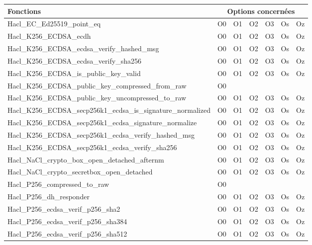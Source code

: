 \raggedleft
\begin{table}[!ht]
  \begin{tabular}{l|cccccc}
    \textbf{Fonctions} & \multicolumn{6}{c}{\textbf{Options concernées}} \\
    \hline
    \rowcolor{blue!5}
    Hacl\_EC\_Ed25519\_point\_eq & O0 & O1 & O2 & O3 & Os & Oz \\
    Hacl\_K256\_ECDSA\_ecdh & O0 & O1 & O2 & O3 & Os & Oz \\
    \rowcolor{blue!5}
    Hacl\_K256\_ECDSA\_ecdsa\_verify\_hashed\_msg & O0 & O1 & O2 & O3 & Os & Oz \\
    Hacl\_K256\_ECDSA\_ecdsa\_verify\_sha256 & O0 & O1 & O2 & O3 & Os & Oz \\
    \rowcolor{blue!5}
    Hacl\_K256\_ECDSA\_is\_public\_key\_valid & O0 & O1 & O2 & O3 & Os & Oz \\
    Hacl\_K256\_ECDSA\_public\_key\_compressed\_from\_raw & O0 & & & & & \\
    \rowcolor{blue!5}
    Hacl\_K256\_ECDSA\_public\_key\_uncompressed\_to\_raw & O0 & O1 & O2 & O3 & Os & Oz \\
    Hacl\_K256\_ECDSA\_secp256k1\_ecdsa\_is\_signature\_normalized & O0 & O1 & O2 & O3 & Os & Oz \\
    \rowcolor{blue!5}
    Hacl\_K256\_ECDSA\_secp256k1\_ecdsa\_signature\_normalize & O0 & O1 & O2 & O3 & Os & Oz \\
    Hacl\_K256\_ECDSA\_secp256k1\_ecdsa\_verify\_hashed\_msg & O0 & O1 & O2 & O3 & Os & Oz \\
    \rowcolor{blue!5}
    Hacl\_K256\_ECDSA\_secp256k1\_ecdsa\_verify\_sha256 & O0 & O1 & O2 & O3 & Os & Oz \\
    Hacl\_NaCl\_crypto\_box\_open\_detached\_afternm & O0 & O1 & O2 & O3 & Os & Oz \\
    \rowcolor{blue!5}
    Hacl\_NaCl\_crypto\_secretbox\_open\_detached & O0 & O1 & O2 & O3 & Os & Oz \\
    Hacl\_P256\_compressed\_to\_raw & O0 & & & & &  \\
    \rowcolor{blue!5}
    Hacl\_P256\_dh\_responder & O0 & O1 & O2 & O3 & Os & Oz \\
    Hacl\_P256\_ecdsa\_verif\_p256\_sha2 & O0 & O1 & O2 & O3 & Os & Oz \\
    \rowcolor{blue!5}
    Hacl\_P256\_ecdsa\_verif\_p256\_sha384 & O0 & O1 & O2 & O3 & Os & Oz \\
    Hacl\_P256\_ecdsa\_verif\_p256\_sha512 & O0 & O1 & O2 & O3 & Os & Oz \\

\end{tabular}
\end{table}
